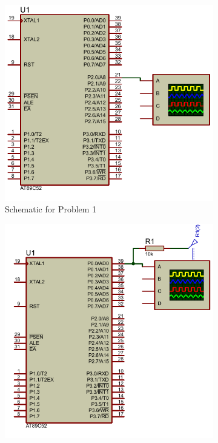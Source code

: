 \documentclass{lab_sheet}
\begin{document}
    \begin{figure}[H]
        \begin{subfigure}{.5\textwidth}
            \centering
            \includegraphics[height=.9\linewidth,width=.9\linewidth]{../Figures/3_1}
            \caption{Schematic for Problem 1}
            \label{fig:proteus_a}
        \end{subfigure}
        \begin{subfigure}{.5\textwidth}
            \centering
            \includegraphics[height=.9\linewidth,width=.9\linewidth]{../Figures/3_2}

\end{subfigure}
\end{figure}
\end{document}
